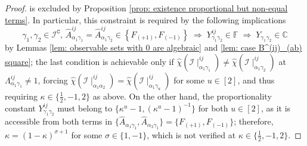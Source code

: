 \documentclass[10pt]{article}
\theoremstyle{remark}%
\theoremstyle{definition}%
\begin{document}
\begin{proof}
is excluded by Proposition \ref{prop: existence proportional but non-equal terms}. In particular, this constraint is required by the following implications
\begin{equation}
\gamma_{1},\gamma_{2}\in\mathcal{I}^{\mathtt{C}},\,\hat{A}_{\alpha_{1}\gamma_{1}}^{ij}=\hat{A}_{\alpha_{1}\gamma_{2}}^{ij}\in\left\{F_{(+1)},F_{(-1)}\right\}\; 
\Rightarrow \; Y_{\gamma_{1}\gamma_{2}}^{ij}\in\mathbb{F} \; \Rightarrow \; Y_{\gamma_{1}\gamma_{2}}\in\mathbb{C}
\label{eq: proportionality implications} 
\end{equation}
by Lemmas \ref{lem: observable sets with 0 are algebraic} and \ref{lem: case B^(ij)_(ab) square}; the last condition is achievable only if $\hat{\chi}(\mathcal{I}\mid_{\alpha_{1}\gamma_{1}}^{ij})\neq \hat{\chi}(\mathcal{I}\mid_{\alpha_{1}\gamma_{2}}^{ij})$ at $\Lambda_{\alpha_{1}\gamma_{1}}^{ij}\neq 1$, forcing $\hat{\chi}(\mathcal{I}\mid_{\alpha_{1}\alpha_{2}}^{ij})=\hat{\chi}(\mathcal{I}\mid_{\alpha_{1}\gamma_{u}}^{ij})$ for some $u\in[2]$, and thus requiring $\kappa\in\{\frac{1}{2},-1,2\}$ as above. On the other hand, the proportionality constant $Y_{\gamma_{1}\gamma_{2}}^{ij}$ must belong to $\{\kappa^{u}-1,(\kappa^{u}-1)^{-1}\}$ for both $u\in[2]$, as it is accessible from both terms in $\{\hat{A}_{\alpha_{1}\gamma_{1}},\hat{A}_{\alpha_{3}\gamma_{1}}\}=\{F_{(+1)},F_{(-1)}\}$; therefore, $\kappa=(1-\kappa)^{\sigma+1}$ for some $\sigma \in \{1,-1\}$, which is not verified at $\kappa\in\{\frac{1}{2},-1,2\}$. 


\end{proof}
\end{document}
